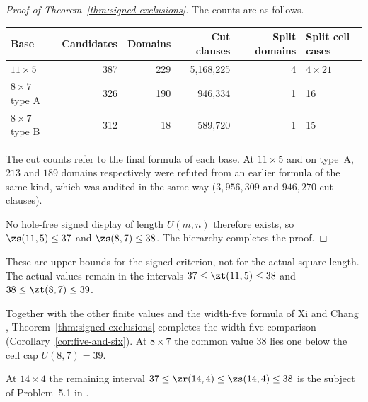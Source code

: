 \begin{proof}[Proof of Theorem~\ref{thm:signed-exclusions}]
The counts are as follows.
\begin{center}
\begin{tabular}{lrrrrl}
\toprule
Base&Candidates&Domains&Cut clauses&Split domains&Split cell cases\\
\midrule
$11\times5$&387&229&5{,}168{,}225&4&$4\times21$\\
$8\times7$ type A&326&190&946{,}334&1&16\\
$8\times7$ type B&312&18&589{,}720&1&15\\
\bottomrule
\end{tabular}
\end{center}
The cut counts refer to the final formula of each base. At $11\times5$ and
on type~A, $213$ and $189$ domains respectively were refuted from an
earlier formula of the same kind, which was audited in the same way
($3{,}956{,}309$ and $946{,}270$ cut clauses).

No hole-free signed display of length $U(m,n)$ therefore exists, so
$\zs(11,5)\le37$ and $\zs(8,7)\le38$. The hierarchy completes the proof.
\end{proof}

\begin{remark}
These are upper bounds for the signed criterion, not for the actual
square length. The actual values remain in the intervals
$37\le\zt(11,5)\le38$ and $38\le\zt(8,7)\le39$.

Together with the other finite values and the width-five formula of
Xi and Chang \cite{XiChangFive},
Theorem~\ref{thm:signed-exclusions} completes the width-five comparison
(Corollary~\ref{cor:five-and-six}). At $8\times7$
the common value $38$ lies one below the cell cap $U(8,7)=39$.

At $14\times4$ the remaining interval
$37\le\zr(14,4)\le\zs(14,4)\le38$ is the subject of
Problem~5.1 in \cite{CC}.
\end{remark}

